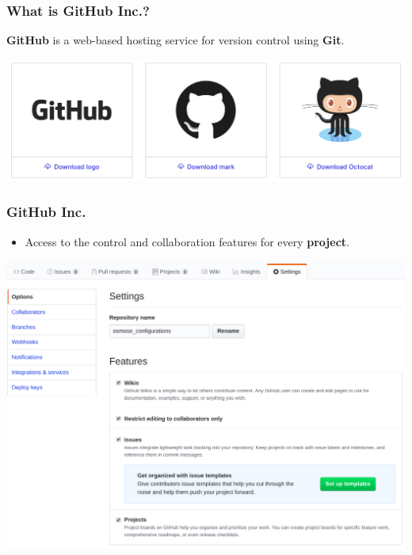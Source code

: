 \documentclass[svgnames]{beamer}
\begin{document}
\begin{frame}
    \frametitle{What is GitHub Inc.?}

    \begin{center}
        \textbf{GitHub} is a web-based hosting service for version control using \textbf{Git}.
    \end{center}

    \begin{center}
        \includegraphics[scale=0.2]{img/github_logos.png}
    \end{center}
\end{frame}


\begin{frame}
\frametitle{GitHub Inc.}
  \begin{itemize}
  \item Access to the control and collaboration features for every \textbf{project}.
  \end{itemize}

\begin{center}
\includegraphics[scale=0.25]{img/githubRepo_settings.png}
\end{center}   

\end{frame}
\end{document}
